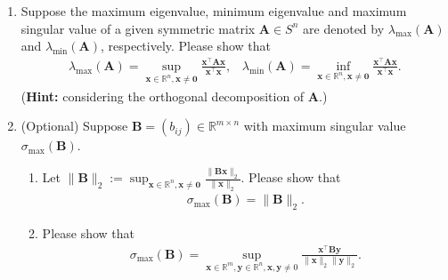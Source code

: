 \documentclass[11pt,letter,notitlepage]{article}
\theoremstyle{definition}
\begin{document}
\newpage
    \begin{exercise}
    \begin{enumerate}
        \item Suppose the maximum eigenvalue, minimum eigenvalue and maximum singular value of a given symmetric matrix $\mathbf{A}\in S^n$ are denoted by $\lambda_{\max}(\mathbf{A})$ and $ \lambda_{\min}(\mathbf{A})$, respectively. Please show that
        \begin{align*}
            \lambda_{\max}(\mathbf{A})=\sup_{\mathbf{x}\in\mathbb{R}^n, \mathbf{x}\not=\mathbf{0}} \frac{\mathbf{x}^\top\mathbf{A}\mathbf{x}}{\mathbf{x}^\top\mathbf{x}},\,\,\,\,\,
            \lambda_{\min}(\mathbf{A})=\inf_{\mathbf{x}\in\mathbb{R}^n, \mathbf{x}\not=\mathbf{0}} \frac{\mathbf{x}^\top\mathbf{A}\mathbf{x}}{\mathbf{x}^\top\mathbf{x}}.
        \end{align*}
        (\textbf{Hint:} considering the orthogonal decomposition of $\mathbf{A}$.)

        \item (Optional) Suppose $\mathbf{B}=(b_{ij})\in \mathbb{R}^{m\times n}$ with maximum singular value $\sigma_{\max}(\mathbf{B})$.
        \begin{enumerate}
            \item Let $\|\mathbf{B}\|_2:=\sup_{\mathbf{x}\in\mathbb{R}^n, \mathbf{x}\not=\mathbf{0}}\frac{\|\mathbf{Bx}\|_2}{\|\mathbf{x}\|_2}$. Please show that
             \begin{align*}
            \sigma_{\max}(\mathbf{B})=\|\mathbf{B}\|_2.
            \end{align*}

            \item Please show that
        \begin{align*}
            \sigma_{\max}(\mathbf{B})=\sup_{\mathbf{x}\in\mathbb{R}^m, \mathbf{y}\in\mathbb{R}^n, \mathbf{x},\mathbf{y}\not=0}\frac{\mathbf{x}^\top \mathbf{B}\mathbf{y}}{\|\mathbf{x}\|_2\|\mathbf{y}\|_2}.
        \end{align*}

        \end{enumerate}
    \end{enumerate}
    \end{exercise}
	

	
	\newpage
	\newpage
    
    
	
\end{document}
